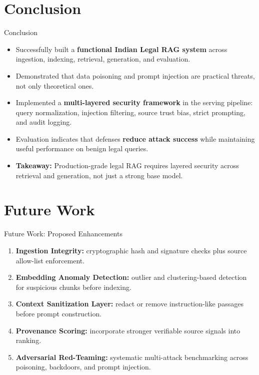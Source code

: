 \documentclass[aspectratio=169]{beamer}
\begin{document}
\section{Conclusion}
\begin{frame}{Conclusion}
    \small
    \begin{itemize}
        \setlength\itemsep{0.75em}
        \item Successfully built a \textbf{functional Indian Legal RAG system} across ingestion, indexing, retrieval, generation, and evaluation.
        \item Demonstrated that data poisoning and prompt injection are practical threats, not only theoretical ones.
        \item Implemented a \textbf{multi-layered security framework} in the serving pipeline: query normalization, injection filtering, source trust bias, strict prompting, and audit logging.
        \item Evaluation indicates that defenses \textbf{reduce attack success} while maintaining useful performance on benign legal queries.
        \item \textbf{Takeaway:} Production-grade legal RAG requires layered security across retrieval and generation, not just a strong base model.
    \end{itemize}
\end{frame}

\section{Future Work}
\begin{frame}{Future Work: Proposed Enhancements}
    \begin{enumerate}
        \setlength\itemsep{0.7em}
        \item \textbf{Ingestion Integrity:} cryptographic hash and signature checks plus source allow-list enforcement.
        \item \textbf{Embedding Anomaly Detection:} outlier and clustering-based detection for suspicious chunks before indexing.
        \item \textbf{Context Sanitization Layer:} redact or remove instruction-like passages before prompt construction.
        \item \textbf{Provenance Scoring:} incorporate stronger verifiable source signals into ranking.
        \item \textbf{Adversarial Red-Teaming:} systematic multi-attack benchmarking across poisoning, backdoors, and prompt injection.
    \end{enumerate}
\end{frame}
\end{document}
